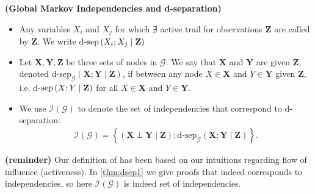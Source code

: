 \documentclass{article}
\newcommand{\bfs}[1]{\textbf{({#1}) }}
\begin{document}
\begin{defa}\bfs{Global Markov Independencies and  d-separation} 
\begin{itemize}
\item Any variables $X_{i}$ and $X_{j}$ for which $\nexists$ active trail for observations $\boldsymbol{Z}$ are called  by $\boldsymbol{Z}$. We write $\mathrm{d}$-$\mathrm{sep}\left(X_{i} ; X_{j} \mid \mathbf{Z} \right)$
    \item Let $\boldsymbol{X}, \boldsymbol{Y}, \boldsymbol{Z}$ be three sets of nodes in $\mathcal{G}$. We say that $\boldsymbol{X}$ and $\boldsymbol{Y}$ are  given $\boldsymbol{Z}$, denoted $\mathrm{d}$-$\mathrm{sep}_{\mathcal{G}}(\boldsymbol{X} ; \boldsymbol{Y} \mid \boldsymbol{Z})$, if  between any node $X \in \boldsymbol{X}$ and $Y \in \boldsymbol{Y}$ given $\boldsymbol{Z}$, i.e. $\mathrm{d}$-$\mathrm{sep}\left(X ; Y \mid \mathbf{Z} \right)$ for all $X\in \boldsymbol{X}$ and $Y\in \boldsymbol{Y}$.
    \item 
We use  $\mathcal{I}(\mathcal{G})$ to denote the set of independencies that correspond to d-separation:
\begin{align*}
\mathcal{I}(\mathcal{G})=\left\{(\boldsymbol{X} \perp \boldsymbol{Y} \mid \boldsymbol{Z}): \text{$\mathrm{d}$-$\mathrm{sep}$}_{\mathcal{G}}(\boldsymbol{X} ; \boldsymbol{Y} \mid \boldsymbol{Z})\right\} . \end{align*}
\end{itemize}
\end{defa}
\begin{rema}\bfs{reminder}
Our definition of  has been based on our intuitions regarding flow of influence (activeness). In \cref{thm:dsep1} we give proofs that  indeed corresponds to independencies, so here $\mathcal{I}(\mathcal{G})$ is indeed set of independencies.
\end{rema}
\end{document}
